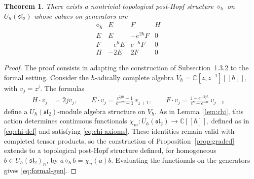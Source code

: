 \documentclass[11pt,english]{article}
\newcommand{\act}{\mathbin{\diamond}}
\newtheorem{theorem}[lemma]{Theorem}
\theoremstyle{definition}
\begin{document}
\begin{theorem}\label{thm:formal}
There exists a nontrivial topological post-Hopf
structure $\act_\hbar$ on
$U_\hbar(\mathfrak{sl}_2)$ whose values on
generators are
\begin{equation}\label{eq:formal-gen}
\begin{array}{c|ccc}
\act_\hbar & E & F & H\\ \hline
E & E & -e^{2\hbar}F & 0\\
F & -e^\hbar E & e^{-\hbar}F & 0\\
H & -2E & 2F & 0
\end{array}
\end{equation}
\end{theorem}

\begin{proof}
The proof consists in adapting the construction of Subsection~1.3.2
to the formal setting. Consider the
$\hbar$-adically complete algebra
$V_\hbar=\mathbb{C}[z,z^{-1}][[\hbar]]$,
with $v_j=z^j$. The formulas
\[
\begin{aligned}
H\cdot v_j&=2jv_j, \qquad
E\cdot v_j
=\frac{e^{2j\hbar}-1}{e^{-2\hbar}-1}\,v_{j+1},\qquad
F\cdot v_j
=\frac{1-e^{-2j\hbar}}{e^\hbar-e^{-\hbar}}\,v_{j-1}
\end{aligned}
\]
define a $U_\hbar(\mathfrak{sl}_2)$-module
algebra structure on $V_\hbar$.
As in Lemma~\ref{lem:chi}, this action
determines continuous functionals
$\chi_m:U_\hbar(\mathfrak{sl}_2)
\to\mathbb{C}[[\hbar]]$, defined as in \eqref{eq:chi-def} and satisfying \eqref{eq:chi-axioms}.
These identities remain valid with completed
tensor products, so the construction of
Proposition~\ref{prop:graded} extends to a topological post-Hopf structure
defined, for homogeneous
$b\in U_\hbar(\mathfrak{sl}_2)_n$, by $a\act_\hbar b=\chi_n(a)b.$
Evaluating the functionals on the generators
gives \eqref{eq:formal-gen}. 
\end{proof}
\end{document}

